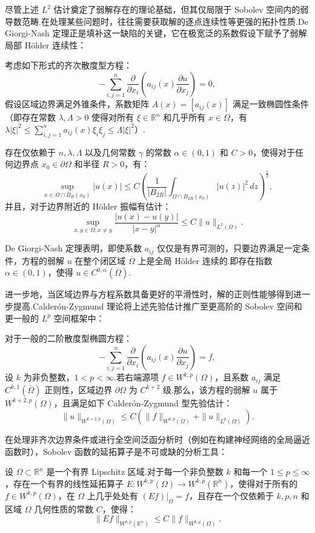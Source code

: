 尽管上述 $L^2$ 估计奠定了弱解存在的理论基础，但其仅局限于 Sobolev 空间内的弱导数范畴.在处理某些问题时，往往需要获取解的逐点连续性等更强的拓扑性质.De Giorgi-Nash 定理正是填补这一缺陷的关键，它在极宽泛的系数假设下赋予了弱解局部 H\"{o}lder 连续性：
\begin{lemma}
考虑如下形式的齐次散度型方程：
$$-\sum_{i,j=1}^n \frac{\partial}{\partial x_i} \left( a_{ij}(x) \frac{\partial u}{\partial x_j} \right) = 0,$$
假设区域边界满足外锥条件，系数矩阵 $A(x) = [a_{ij}(x)]$ 满足一致椭圆性条件（即存在常数 $\lambda, \Lambda > 0$ 使得对所有 $\xi \in \mathbb{R}^n$ 和几乎所有 $x \in \Omega$，有 $\lambda |\xi|^2 \leq \sum_{i,j=1}^n a_{ij}(x) \xi_i \xi_j \leq \Lambda |\xi|^2$）.

存在仅依赖于 $n, \lambda, \Lambda$ 以及几何常数 $\gamma$ 的常数 $\alpha \in (0, 1)$ 和 $C > 0$，使得对于任何边界点 $x_0 \in \partial\Omega$ 和半径 $R > 0$，有：
$$\sup_{x \in \Omega \cap B_{R}(x_0)} |u(x)| \le C \left( \frac{1}{|B_{2R}|} \int_{\Omega \cap B_{2R}(x_0)} |u(z)|^2 \, dz \right)^{\frac{1}{2}},$$
并且，对于边界附近的 H\"{o}lder 振幅有估计：
$$\sup_{x, y \in \Omega, x \neq y} \frac{|u(x) - u(y)|}{|x - y|^\alpha} \le C \|u\|_{L^2(\Omega)}.$$
\end{lemma}

De Giorgi-Nash 定理表明，即使系数 $a_{ij}$ 仅仅是有界可测的，只要边界满足一定条件，方程的弱解 $u$ 在整个闭区域 $\overline{\Omega}$ 上是全局 H\"{o}lder 连续的.即存在指数 $\alpha \in (0,1)$，使得 $u \in C^{0,\alpha}(\overline{\Omega})$.

进一步地，当区域边界与方程系数具备更好的平滑性时，解的正则性能够得到进一步提高.Calderón-Zygmund 理论将上述先验估计推广至更高阶的 Sobolev 空间和更一般的 $L^p$ 空间框架中：
\begin{lemma}\label{lem:lp}
对于一般的二阶散度型椭圆方程：
$$-\sum_{i,j=1}^n \frac{\partial}{\partial x_i} \left( a_{ij}(x) \frac{\partial u}{\partial x_j} \right) = f,$$
设 $k$ 为非负整数，$1 < p < \infty$.若右端源项 $f \in W^{k,p}(\Omega)$，且系数 $a_{ij}$ 满足 $C^{k,1}(\bar{\Omega})$ 正则性，区域边界 $\partial \Omega$ 为 $C^{k+2}$ 级.那么，该方程的弱解 $u$ 属于 $W^{k+2,p}(\Omega)$，且满足如下 Calderón-Zygmund 型先验估计：
$$\|u\|_{W^{k+2,p}(\Omega)} \leq C \left( \|f\|_{W^{k,p}(\Omega)} + \|u\|_{L^p(\Omega)} \right).$$
\end{lemma}

在处理非齐次边界条件或进行全空间泛函分析时（例如在构建神经网络的全局逼近函数时），Sobolev 函数的延拓算子是不可或缺的分析工具：
\begin{lemma}\label{lem:extension}
设 $\Omega \subset \mathbb{R}^n$ 是一个有界 Lipschitz 区域.对于每一个非负整数 $k$ 和每一个 $1 \leq p \leq \infty$，存在一个有界的线性延拓算子 $E: W^{k,p}(\Omega) \to W^{k,p}(\mathbb{R}^n)$，使得对于所有的 $f \in W^{k,p}(\Omega)$，在 $\Omega$ 上几乎处处有 $(Ef)|_\Omega = f$，且存在一个仅依赖于 $k, p, n$ 和区域 $\Omega$ 几何性质的常数 $C$，使得：
$$\|Ef\|_{W^{k,p}(\mathbb{R}^n)} \leq C \|f\|_{W^{k,p}(\Omega)}.$$
\end{lemma}

